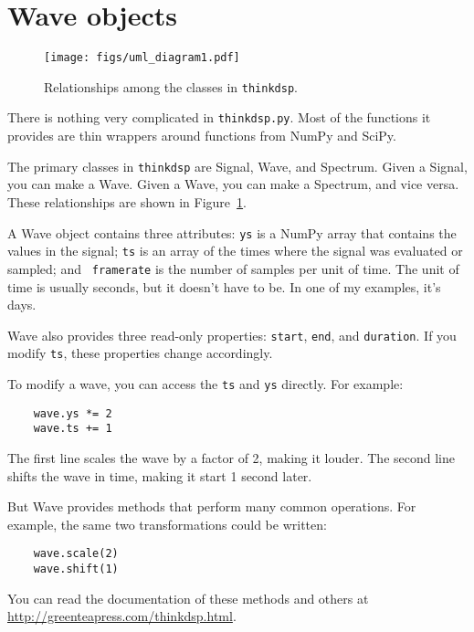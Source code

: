 \section{Wave objects}

\begin{figure}
	\centerline{\texttt{[image: figs/uml\_diagram1.pdf]}}
	\caption{Relationships among the classes in {\tt thinkdsp}.}
	\label{fig.diagram1}
\end{figure}

There is nothing very complicated in {\tt thinkdsp.py}.  Most
of the functions it provides are thin wrappers around functions
from NumPy and SciPy.

The primary classes in {\tt thinkdsp} are Signal, Wave, and Spectrum.
Given a Signal, you can make a Wave.  Given a Wave, you can
make a Spectrum, and vice versa.  These relationships are shown
in Figure~\ref{fig.diagram1}.

A Wave object contains three attributes: {\tt ys} is a NumPy array
that contains the values in the signal; {\tt ts} is an array of the
times where the signal was evaluated or sampled; and {\tt
	framerate} is the number of samples per unit of time.  The
unit of time is usually seconds, but it doesn't have to be.  In
one of my examples, it's days.

Wave also provides three read-only properties: {\tt start},
{\tt end}, and {\tt duration}.  If you modify {\tt ts}, these
properties change accordingly.

To modify a wave, you can access the {\tt ts} and {\tt ys} directly.
For example:

\begin{verbatim}
	wave.ys *= 2
	wave.ts += 1
\end{verbatim}

The first line scales the wave by a factor of 2, making
it louder.  The second line shifts the wave in time, making it
start 1 second later.

But Wave provides methods that perform many common operations.
For example, the same two transformations could be written:

\begin{verbatim}
	wave.scale(2)
	wave.shift(1)
\end{verbatim}

You can read the documentation of these methods and others at
\url{http://greenteapress.com/thinkdsp.html}.


